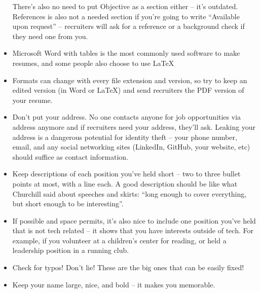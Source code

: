 \documentclass{article}
\begin{document}
\begin{itemize}
  There's also no need to put Objective as a section either -- it's
  outdated. References is also not a needed section if you're going to write
  ``Available upon request'' -- recruiters will ask for a reference or a
  background check if they need one from you.
\item Microsoft Word with tables is the most commonly used software to make
  resumes, and some people also choose to use \LaTeX
\item Formats can change with every file extension and version, so try to keep
  an edited version (in Word or \LaTeX) and send recruiters the PDF version of
  your resume.
\item Don't put your address. No one contacts anyone for job opportunities via
  address anymore and if recruiters need your address, they'll ask. Leaking your
  address is a dangerous potential for identity theft -- your phone number,
  email, and any social networking sites (LinkedIn, GitHub, your website, etc)
  should suffice as contact information.
\item Keep descriptions of each position you've held short -- two to three
  bullet points at most, with a line each. A good description should be like
  what Churchill said about speeches and skirts: ``long enough to cover
  everything, but short enough to be interesting''.
\item If possible and space permits, it's also nice to include one position
  you've held that is not tech related -- it shows that you have interests
  outside of tech. For example, if you volunteer at a children's center for
  reading, or held a leadership position in a running club.
\item Check for typos! Don't lie! These are the big ones that can be easily
  fixed!
\item Keep your name large, nice, and bold -- it makes you memorable.
\end{itemize} 
\end{document}
